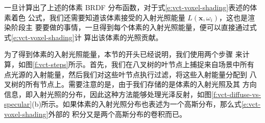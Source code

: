 一旦计算出了上述的体素 BRDF 分布函数，对于式\ref{e:vct-voxel-shading}表述的体素着色 公式，我们还需要知道该体素接受的入射光照能量 $L(\mathbf{x}, \omega_i)$，这也是渲染阶段主 要要做的事情，一旦得到每个体素的入射光照能量，便可以直接通过式式\ref{e:vct-voxel-shading}计 算出该体素的光照贡献。

为了得到体素的入射光照能量，本节的开头已经说明，我们使用两个步骤 来计算，如图\ref{f:vct-steps}所示。首先，我们在八叉树的叶节点上捕捉来自场景中所有 点光源的入射能量，然后我们对这些叶节点执行过滤，将这些入射能量分配到 八叉树的所有节点上。需要注意的是，由于我们存储的是体素的入射光照及其 方向信息，即入射光照的分布，因此这种方法能够处理光泽反射，如图\ref{f:vct-diffuse-vs-specular}(b)所示。如果体素的入射光照分布也表述为一个高斯分布，那么式\ref{e:vct-voxel-shading}外部的 积分又是两个高斯分布的卷积而已。

